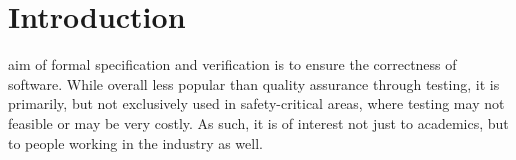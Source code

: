 \documentclass[11pt,journal]{IEEEtran}
\begin{document}
	
	\IEEEdisplaynotcompsoctitleabstractindextext
	
	
	\IEEEpeerreviewmaketitle
	
	
	
	\section{Introduction}
	 aim of formal specification and verification is to ensure the correctness of software. While overall less popular than quality assurance through testing, it is primarily, but not exclusively used in safety-critical areas, where testing may not feasible or may be very costly. As such, it is of interest not just to academics, but to people working in the industry as well. 
	

	
\end{document}
